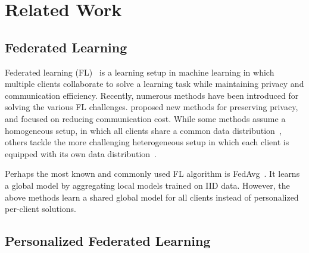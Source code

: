 \documentclass{article}
\begin{document}
\section{Related Work}


\label{related}
\subsection{Federated Learning}
 Federated learning (FL)~\citep{McMahan2017CommunicationEfficientLO, kairouz2019advances, mothukuri2021survey, Li2019FederatedLS, li2020federated} is a learning setup in machine learning in which multiple clients collaborate to solve a learning task while maintaining privacy and communication efficiency. Recently, numerous methods have been introduced for solving the various FL challenges. \citet{duchi2014privacy, mcmahan2017learning, agarwal2018cpsgd, zhu2019federated} proposed new methods for preserving privacy, and \citet{reisizadeh2020fedpaq, dai2019hyper, basu2020qsparse, li2020acceleration, stich2018local} focused on reducing communication cost. 
While some methods assume a homogeneous setup, in which all clients share a common data distribution~\citep{wang2018cooperative, lin2018don}, others tackle the more challenging heterogeneous setup in which each client is equipped with its own data distribution~\citep{zhou2017convergence, hanzely2020federated, zhao2018federated, sahu2018convergence, karimireddy2019scaffold, haddadpour2019convergence,Hsu2019MeasuringTE}.

Perhaps the most known and commonly used FL algorithm is FedAvg~\citep{McMahan2017CommunicationEfficientLO}. It learns a global model by aggregating local models trained on IID data. However, the above methods learn a shared global model for all clients instead of personalized per-client solutions.

\subsection{Personalized Federated Learning}
\end{document}
